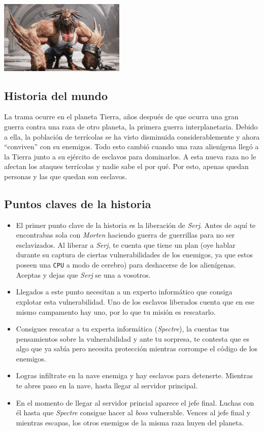 \documentclass[11pt, twoside]{article}
\begin{document}
\begin{center}
\includegraphics[width=6cm]{./images/tanque.jpg}
\end{center}


\subsection{Historia del mundo}

La trama ocurre en el planeta Tierra, años después de que ocurra una gran guerra contra una raza de otro planeta, la primera guerra interplanetaria. Debido a ella, la población de terrícolas se ha visto disminuida considerablemente y ahora ``conviven'' con su enemigos. Todo esto cambió cuando una raza alienígena llegó a la Tierra junto a su ejército de esclavos para dominarlos. A esta nueva raza no le afectan los ataques terrícolas y nadie sabe el por qué. Por esto, apenas quedan personas y las que quedan son esclavos. 

\subsection{Puntos claves de la historia}

\begin{itemize}
\item El primer punto clave de la historia es la liberación de \textit{Serj}. Antes de aquí te encontrabas sola con \textit{Morten} haciendo guerra de guerrillas para no ser esclavizados. Al liberar a \textit{Serj}, te cuenta que tiene un plan (oye hablar durante su captura de ciertas vulnerabilidades de los enemigos, ya que estos poseen una \texttt{CPU} a modo de cerebro) para deshacerse de los alienígenas. Aceptas y dejas que \textit{Serj} se una a vosotros.
\item Llegados a este punto necesitan a un experto informático que consiga explotar esta vulnerabilidad. Uno de los esclavos liberados cuenta que en ese mismo campamento hay uno, por lo que tu misión es rescatarlo. 
\item Consigues rescatar a tu experta informática (\textit{Spectre}), la cuentas tus pensamientos sobre la vulnerabilidad y ante tu sorpresa, te contesta que es algo que ya sabía pero necesita protección mientras corrompe el código de los enemigos. 
\item Logras infiltrate en la nave enemiga y hay esclavos para detenerte. Mientras te abres paso en la nave, hasta llegar al servidor principal. 
\item En el momento de llegar al servidor princial aparece el jefe final. Luchas con él hasta que \textit{Spectre} consigue hacer al \textit{boss} vulnerable. Vences al jefe final y mientras escapas, los otros enemigos de la misma raza huyen del planeta. 
\end{itemize}
\end{document}
